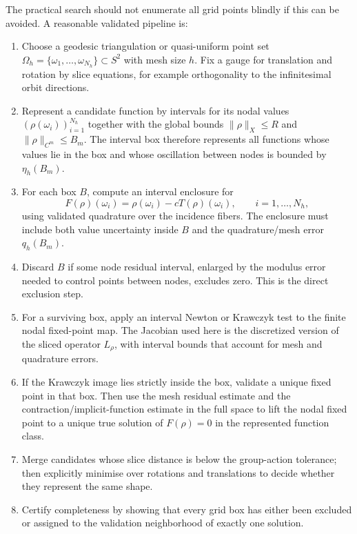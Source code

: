 \documentclass[12pt]{article}
\begin{document}
The practical search should not enumerate all grid points blindly if this can
be avoided. A reasonable validated pipeline is:
\begin{enumerate}[leftmargin=2em]
  \item Choose a geodesic triangulation or quasi-uniform point set
    $\Omega_h=\{\omega_1,\ldots,\omega_{N_h}\}\subset S^2$ with mesh size $h$.
    Fix a gauge for translation and rotation by slice equations, for example
    orthogonality to the infinitesimal orbit directions.

  \item Represent a candidate function by intervals for its nodal values
    $(\rho(\omega_i))_{i=1}^{N_h}$ together with the global bounds
    $\|\rho\|_X\leq R$ and $\|\rho\|_{C^m}\leq B_m$. The interval box therefore
    represents all functions whose values lie in the box and whose oscillation
    between nodes is bounded by $\eta_h(B_m)$.

  \item For each box $B$, compute an interval enclosure for
    \[
      F(\rho)(\omega_i)=\rho(\omega_i)-cT(\rho)(\omega_i),
      \qquad i=1,\ldots,N_h,
    \]
    using validated quadrature over the incidence fibers. The enclosure must
    include both value uncertainty inside $B$ and the quadrature/mesh error
    $q_h(B_m)$.

  \item Discard $B$ if some node residual interval, enlarged by the modulus
    error needed to control points between nodes, excludes zero. This is the
    direct exclusion step.

  \item For a surviving box, apply an interval Newton or Krawczyk test to the
    finite nodal fixed-point map. The Jacobian used here is the discretized
    version of the sliced operator $L_\rho$, with interval bounds that account
    for mesh and quadrature errors.

  \item If the Krawczyk image lies strictly inside the box, validate a unique
    fixed point in that box. Then use the mesh residual estimate and the
    contraction/implicit-function estimate in the full space to lift the nodal
    fixed point to a unique true solution of $F(\rho)=0$ in the represented
    function class.

  \item Merge candidates whose slice distance is below the group-action
    tolerance; then explicitly minimise over rotations and translations to
    decide whether they represent the same shape.

  \item Certify completeness by showing that every grid box has either been
    excluded or assigned to the validation neighborhood of exactly one
    solution.
\end{enumerate}
\end{document}
